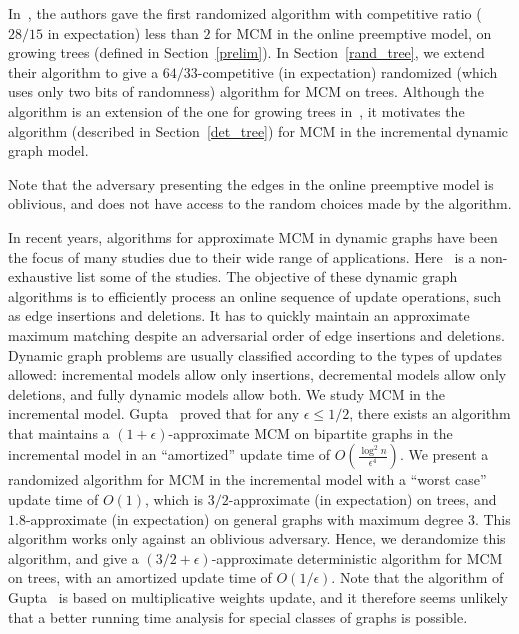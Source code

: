 \documentclass[11pt]{article}
\begin{document}
In~\cite{sumedh}, the authors gave the first randomized algorithm with competitive ratio ($28/15$ in expectation) less than $2$ for MCM in the online preemptive model, on growing trees (defined in Section~\ref{prelim}). In Section~\ref{rand_tree}, we extend their algorithm to give a $64/33$-competitive (in expectation) randomized (which uses only two bits of randomness) algorithm  for MCM on trees. Although the algorithm is an extension of the one for growing trees in~\cite{sumedh}, it motivates the algorithm (described in Section~\ref{det_tree}) for MCM in the incremental dynamic graph model.

Note that the adversary presenting the edges in the online preemptive model is oblivious, and does not have access to the random choices made by the algorithm.

In recent years, algorithms for approximate MCM in dynamic graphs have been the focus of many studies due to their wide range of applications. Here~\cite{bernstein,sayan,peng,solomon} is a non-exhaustive list some of the studies. The objective of these dynamic graph algorithms is to efficiently process an online sequence of update operations, such as edge insertions and deletions. It has to quickly maintain an approximate maximum matching despite an adversarial order of edge insertions and deletions.  Dynamic graph problems are usually classified according to the types of updates allowed: incremental models allow only insertions, decremental models allow only deletions, and fully dynamic models allow both. We study MCM in the incremental model. Gupta~\cite{gupta} proved that for any $\epsilon\leq 1/2$, there exists an algorithm that maintains a $(1+\epsilon )$-approximate MCM on bipartite graphs in the incremental model in an ``amortized'' update time of $O\left(\frac{\log^2  n}{\epsilon^4}\right)$. We present a randomized algorithm for MCM in the incremental model with a ``worst case'' update time of $O(1)$, which is $3/2$-approximate (in expectation) on trees, and $1.8$-approximate (in expectation) on general graphs with maximum degree $3$. This algorithm works only against an oblivious adversary. Hence, we derandomize this algorithm, and give a $(3/2+\epsilon)$-approximate deterministic algorithm for MCM on trees, with an amortized update time of $O(1/\epsilon)$. Note that the algorithm of Gupta~\cite{gupta} is based on multiplicative weights update, and it therefore seems unlikely that a better running time analysis for special classes of graphs is possible.
\end{document}
